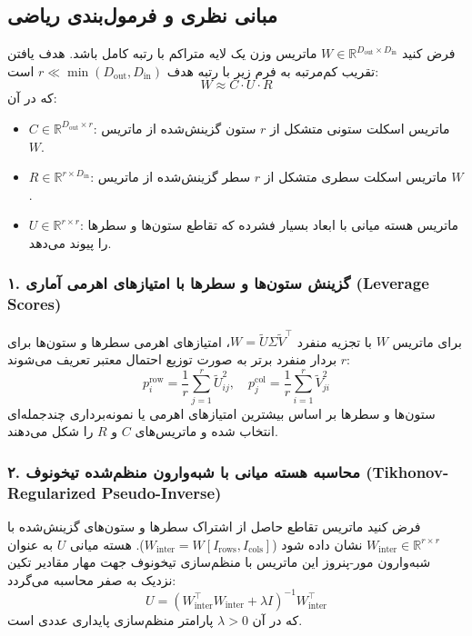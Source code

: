 \subsection{مبانی نظری و فرمول‌بندی ریاضی}
فرض کنید $W \in \mathbb{R}^{D_{\text{out}} \times D_{\text{in}}}$ ماتریس وزن یک لایه متراکم با رتبه کامل باشد. هدف یافتن تقریب کم‌مرتبه به فرم زیر با رتبه هدف $r \ll \min(D_{\text{out}}, D_{\text{in}})$ است:
\begin{equation}
W \approx C \cdot U \cdot R
\end{equation}
که در آن:
\begin{itemize}
    \item $C \in \mathbb{R}^{D_{\text{out}} \times r}$: ماتریس اسکلت ستونی متشکل از $r$ ستون گزینش‌شده از ماتریس $W$.
    \item $R \in \mathbb{R}^{r \times D_{\text{in}}}$: ماتریس اسکلت سطری متشکل از $r$ سطر گزینش‌شده از ماتریس $W$.
    \item $U \in \mathbb{R}^{r \times r}$: ماتریس هسته میانی با ابعاد بسیار فشرده که تقاطع ستون‌ها و سطرها را پیوند می‌دهد.
\end{itemize}

\subsubsection*{۱. گزینش ستون‌ها و سطرها با امتیازهای اهرمی آماری (Leverage Scores)}
برای ماتریس $W$ با تجزیه منفرد $W = \widetilde{U} \Sigma \widetilde{V}^\top$، امتیازهای اهرمی سطرها و ستون‌ها برای $r$ بردار منفرد برتر به صورت توزیع احتمال معتبر تعریف می‌شوند:
\begin{equation}
p_i^{\text{row}} = \frac{1}{r} \sum_{j=1}^r \widetilde{U}_{ij}^2, \quad p_j^{\text{col}} = \frac{1}{r} \sum_{i=1}^r \widetilde{V}_{ji}^2
\end{equation}
ستون‌ها و سطرها بر اساس بیشترین امتیازهای اهرمی یا نمونه‌برداری چندجمله‌ای انتخاب شده و ماتریس‌های $C$ و $R$ را شکل می‌دهند.

\subsubsection*{۲. محاسبه هسته میانی با شبه‌وارون منظم‌شده تیخونوف (Tikhonov-Regularized Pseudo-Inverse)}
فرض کنید ماتریس تقاطع حاصل از اشتراک سطرها و ستون‌های گزینش‌شده با $W_{\text{inter}} \in \mathbb{R}^{r \times r}$ نشان داده شود ($W_{\text{inter}} = W[I_{\text{rows}}, I_{\text{cols}}]$). هسته میانی $U$ به عنوان شبه‌وارون مور-پنروز این ماتریس با منظم‌سازی تیخونوف جهت مهار مقادیر تکین نزدیک به صفر محاسبه می‌گردد:
\begin{equation}
U = (W_{\text{inter}}^\top W_{\text{inter}} + \lambda I)^{-1} W_{\text{inter}}^\top
\end{equation}
که در آن $\lambda > 0$ پارامتر منظم‌سازی پایداری عددی است.


